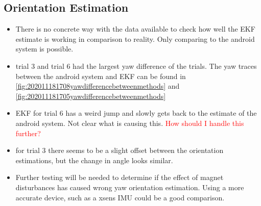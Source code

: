 \newpage


\subsection*{Orientation Estimation}

\begin{itemize}
	\item There is no concrete way with the data available to check how well the EKF estimate is working in comparison to reality. Only comparing to the android system is possible.
	\item trial 3 and trial 6 had the largest yaw difference of the trials. The yaw traces between the android system and EKF can be found in \cref{fig:202011181708yawdifferencebetweenmethods} and \cref{fig:202011181705yawdifferencebetweenmethods}
	\item EKF for trial 6 has a weird jump and slowly gets back to the estimate of the android system. Not clear what is causing this. \textcolor{red}{How should I handle this further?}
	\item for trial 3 there seems to be a slight offset between the orientation estimations, but the change in angle looks similar.
	\item Further testing will be needed to determine if the effect of magnet disturbances has caused wrong yaw orientation estimation. Using a more accurate device, such as a xsens IMU could be a good comparison.
\end{itemize}

